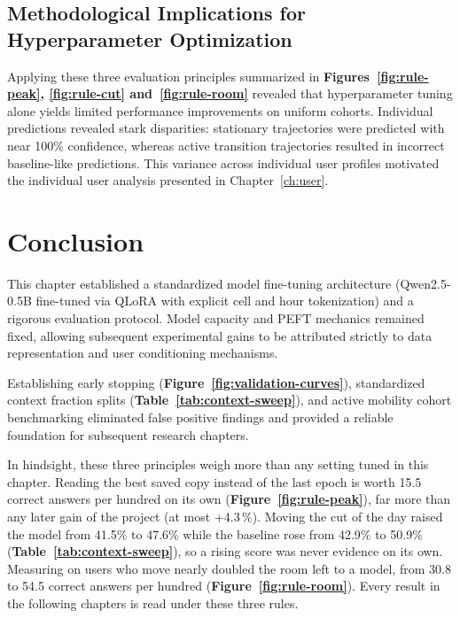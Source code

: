 \FloatBarrier

\subsection{Methodological Implications for Hyperparameter Optimization}

Applying these three evaluation principles summarized in \textbf{Figures~\ref{fig:rule-peak}, \ref{fig:rule-cut} and~\ref{fig:rule-room}} revealed that hyperparameter tuning alone yields limited performance improvements on uniform cohorts. Individual predictions revealed stark disparities: stationary trajectories were predicted with near 100\% confidence, whereas active transition trajectories resulted in incorrect baseline-like predictions. This variance across individual user profiles motivated the individual user analysis presented in Chapter~\ref{ch:user}.

\section{Conclusion}
\label{sec:retro-tools}

This chapter established a standardized model fine-tuning architecture (Qwen2.5-0.5B fine-tuned via QLoRA with explicit cell and hour tokenization) and a rigorous evaluation protocol. Model capacity and PEFT mechanics remained fixed, allowing subsequent experimental gains to be attributed strictly to data representation and user conditioning mechanisms.

Establishing early stopping (\textbf{Figure~\ref{fig:validation-curves}}), standardized context fraction splits (\textbf{Table~\ref{tab:context-sweep}}), and active mobility cohort benchmarking eliminated false positive findings and provided a reliable foundation for subsequent research chapters.

In hindsight, these three principles weigh more than any setting tuned in this chapter. Reading the best saved copy instead of the last epoch is worth 15.5 correct answers per hundred on its own (\textbf{Figure~\ref{fig:rule-peak}}), far more than any later gain of the project (at most +4.3\,\%). Moving the cut of the day raised the model from 41.5\% to 47.6\% while the baseline rose from 42.9\% to 50.9\% (\textbf{Table~\ref{tab:context-sweep}}), so a rising score was never evidence on its own. Measuring on users who move nearly doubled the room left to a model, from 30.8 to 54.5 correct answers per hundred (\textbf{Figure~\ref{fig:rule-room}}). Every result in the following chapters is read under these three rules.


